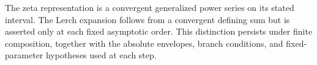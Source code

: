 The zeta representation is a convergent generalized power series on
its stated interval. The Lerch expansion follows from a convergent
defining sum but is asserted only at each fixed asymptotic order.
This distinction persists under finite composition, together with the
absolute envelopes, branch conditions, and fixed-parameter hypotheses
used at each step.
